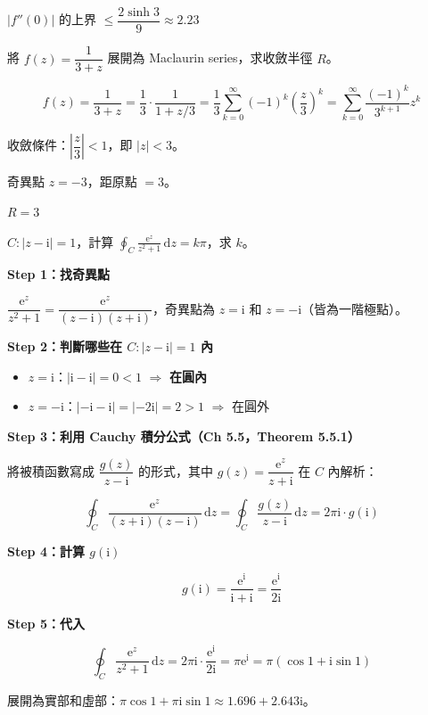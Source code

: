 \documentclass[12pt,a4paper]{article}
\newcommand{\dd}{\,\mathrm{d}}
\newcommand{\ii}{\mathrm{i}}
\newcommand{\ee}{\mathrm{e}}
\begin{document}
\begin{ansbox}
$|f''(0)|$ 的上界 $\le\boxed{\dfrac{2\sinh 3}{9}\approx 2.23}$
\end{ansbox}

\begin{qbox}
將 $f(z)=\dfrac{1}{3+z}$ 展開為 Maclaurin series，求收斂半徑 $R$。
\end{qbox}

\begin{solbox}[解]
$$f(z)=\frac{1}{3+z}=\frac{1}{3}\cdot\frac{1}{1+z/3}=\frac{1}{3}\sum_{k=0}^{\infty}(-1)^k\left(\frac{z}{3}\right)^k=\sum_{k=0}^{\infty}\frac{(-1)^k}{3^{k+1}}z^k$$

收斂條件：$\left|\dfrac{z}{3}\right|<1$，即 $|z|<3$。

奇異點 $z=-3$，距原點 $=3$。
\end{solbox}

\begin{ansbox}
$R=\boxed{3}$
\end{ansbox}

\begin{qbox}[第 6 題\,---\,圍道積分與奇異點]
$C:|z-\ii|=1$，計算 $\displaystyle\oint_C\frac{\ee^z}{z^2+1}\dd{z}=k\pi$，求 $k$。
\end{qbox}

\begin{solbox}[解]
\textbf{Step 1：找奇異點}

$\dfrac{\ee^z}{z^2+1}=\dfrac{\ee^z}{(z-\ii)(z+\ii)}$，奇異點為 $z=\ii$ 和 $z=-\ii$（皆為一階極點）。

\textbf{Step 2：判斷哪些在 $C:|z-\ii|=1$ 內}

\begin{itemize}
\item $z=\ii$：$|\ii-\ii|=0<1$ $\Rightarrow$ \textbf{在圓內}
\item $z=-\ii$：$|-\ii-\ii|=|-2\ii|=2>1$ $\Rightarrow$ 在圓外
\end{itemize}

\textbf{Step 3：利用 Cauchy 積分公式（Ch 5.5，Theorem 5.5.1）}

將被積函數寫成 $\dfrac{g(z)}{z-\ii}$ 的形式，其中 $g(z)=\dfrac{\ee^z}{z+\ii}$ 在 $C$ 內解析：

$$\oint_C\frac{\ee^z}{(z+\ii)(z-\ii)}\dd{z}=\oint_C\frac{g(z)}{z-\ii}\dd{z}=2\pi\ii\cdot g(\ii)$$

\textbf{Step 4：計算 $g(\ii)$}

$$g(\ii)=\frac{\ee^\ii}{\ii+\ii}=\frac{\ee^\ii}{2\ii}$$

\textbf{Step 5：代入}

$$\oint_C\frac{\ee^z}{z^2+1}\dd{z}=2\pi\ii\cdot\frac{\ee^\ii}{2\ii}=\pi\ee^\ii=\pi(\cos 1+\ii\sin 1)$$

展開為實部和虛部：$\pi\cos 1+\pi\ii\sin 1\approx 1.696+2.643\ii$。
\end{solbox}
\end{document}
